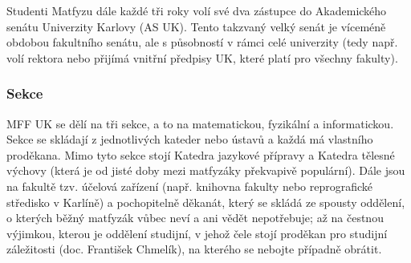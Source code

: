 Studenti Matfyzu dále každé tři roky volí své dva zástupce do Akademického senátu Univerzity Karlovy (AS UK). Tento takzvaný velký senát je víceméně obdobou fakultního senátu, ale s působností v rámci celé univerzity (tedy např. volí rektora nebo přijímá vnitřní předpisy UK, které platí pro všechny fakulty).


\subsubsection{Sekce}
MFF UK se dělí na tři sekce, a to na matematickou, fyzikální a informatickou. Sekce se skládají z jednotlivých kateder nebo ústavů a každá má vlastního proděkana. Mimo tyto sekce stojí Katedra jazykové přípravy a Katedra tělesné výchovy (která je od jisté doby mezi matfyzáky překvapivě populární). Dále jsou na fakultě tzv. účelová zařízení (např. knihovna fakulty nebo reprografické středisko v Karlíně) a pochopitelně děkanát, který se skládá ze spousty oddělení, o kterých běžný matfyzák vůbec neví a ani vědět nepotřebuje; až na čestnou výjimkou, kterou je oddělení studijní, v jehož čele stojí proděkan pro studijní záležitosti (doc. František Chmelík), na kterého se nebojte případně obrátit.